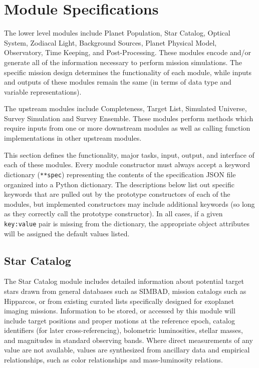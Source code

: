 \documentclass[cleanfoot]{asme2ej}
\begin{document}
\section{Module Specifications}\label{sec:modules}
The lower level modules include Planet Population, Star Catalog, Optical System, Zodiacal Light, Background Sources, Planet Physical Model, Observatory, Time Keeping, and Post-Processing.  These modules encode and/or generate all of the information necessary to perform mission simulations.  The specific mission design determines the functionality of each module, while inputs and outputs of these modules remain the same (in terms of data type and variable representations).  

The upstream modules include Completeness, Target List, Simulated Universe, Survey Simulation and Survey Ensemble. These modules perform methods which require inputs from one or more downstream modules as well as calling function implementations in other upstream modules. 

This section defines the functionality, major tasks, input, output, and interface of each of these modules. Every module constructor must always accept a keyword dictionary (\verb+**spec+) representing the contents of the specification JSON file organized into a Python dictionary. The descriptions below list out specific keywords that are pulled out by the prototype constructors of each of the modules, but implemented constructors may include additional keywords (so long as they correctly call the prototype constructor).  In all cases, if a given \verb+key:value+ pair is missing from the dictionary, the appropriate object attributes will be assigned the default values listed.



\subsection{Star Catalog} \label{sec:starcatalog}
The Star Catalog module includes detailed information about potential target stars drawn from general databases such as SIMBAD, mission catalogs such as Hipparcos, or from existing curated lists specifically designed for exoplanet imaging missions.  Information to be stored, or accessed by this module will include target positions and proper motions at the reference epoch, catalog identifiers (for later cross-referencing), bolometric luminosities, stellar masses, and magnitudes in standard observing bands.  Where direct measurements of any value are not available, values are synthesized from ancillary data and empirical relationships, such as color relationships and mass-luminosity relations.
\end{document}
